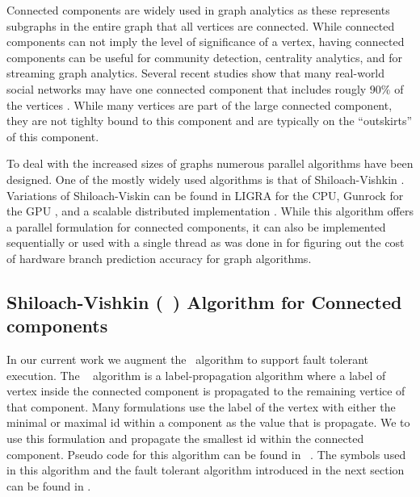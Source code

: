 


Connected components are widely used in graph analytics as these represents subgraphs in the entire 
graph that all vertices are connected. While connected components can not imply the level of 
significance of a vertex, having connected components can be useful for community detection, 
centrality analytics, and for streaming graph analytics.  
Several recent studies show that many real-world social networks may have one connected component 
that includes rougly $90\%$ of the vertices \cite{leskovec2009community,strogatz2001exploring}. 
While many vertices are part of the large connected component, they are not tighlty bound to this 
component and are typically on the ``outskirts'' of this component.

To deal with the increased sizes of graphs numerous parallel algorithms have been designed. One of 
the mostly widely used algorithms is that of Shiloach-Vishkin \cite{ShiloachVishkin}. Variations 
of Shiloach-Viskin can be found in LIGRA \cite{ligra} for the CPU, Gunrock for the GPU 
\cite{gunrock}, and a scalable distributed implementation \cite{flick2015parallel}.	
While this algorithm offers a parallel formulation for connected components, it can also be 
implemented sequentially or used with a single thread as was done in \cite{greenbranchavoiding} for 
figuring out the cost of hardware branch prediction accuracy for graph algorithms. 

\subsection*{Shiloach-Vishkin (~\sv) Algorithm for Connected components}

In our current work we augment the ~\sv algorithm to support fault tolerant execution. The ~\sv 
algorithm is a label-propagation algorithm where a label of vertex inside the 
connected component is propagated to the remaining vertice of that component. Many formulations 
use the label of the vertex with either the minimal or maximal id within a component as the value 
that is propagate. We to use this formulation and propagate the smallest id within the connected 
component. Pseudo code for this algorithm can be found in ~. The symbols 
used in this algorithm and the fault tolerant algorithm introduced in the next section can be found 
in .

